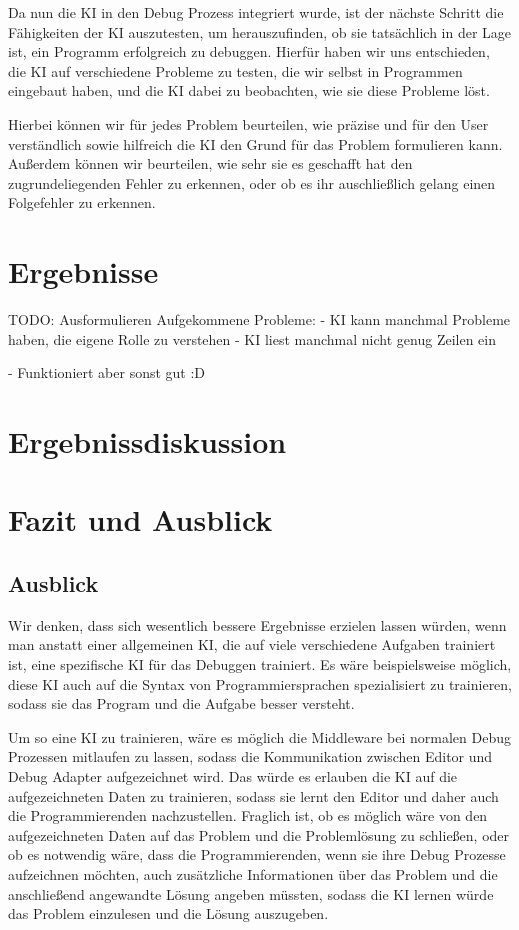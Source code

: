 \documentclass[a4paper,12pt,ngerman]{scrartcl}
\begin{document}
Da nun die KI in den Debug Prozess integriert wurde, ist der nächste Schritt die Fähigkeiten der KI auszutesten, um herauszufinden, ob sie tatsächlich in der Lage ist, ein Programm erfolgreich zu debuggen. Hierfür haben wir uns entschieden, die KI auf verschiedene Probleme zu testen, die wir selbst in Programmen eingebaut haben, und die KI dabei zu beobachten, wie sie diese Probleme löst.

Hierbei können wir für jedes Problem beurteilen, wie präzise und für den User verständlich sowie hilfreich die KI den Grund für das Problem formulieren kann. Außerdem können wir beurteilen, wie sehr sie es geschafft hat den zugrundeliegenden Fehler zu erkennen, oder ob es ihr auschließlich gelang einen Folgefehler zu erkennen.

\section{Ergebnisse}

TODO: Ausformulieren
Aufgekommene Probleme:
- KI kann manchmal Probleme haben, die eigene Rolle zu verstehen
- KI liest manchmal nicht genug Zeilen ein

- Funktioniert aber sonst gut :D

\section{Ergebnissdiskussion}

\section{Fazit und Ausblick}

\subsection{Ausblick}

Wir denken, dass sich wesentlich bessere Ergebnisse erzielen lassen würden, wenn man anstatt einer allgemeinen KI, die auf viele verschiedene Aufgaben trainiert ist, eine spezifische KI für das Debuggen trainiert. Es wäre beispielsweise möglich, diese KI auch auf die Syntax von Programmiersprachen spezialisiert zu trainieren, sodass sie das Program und die Aufgabe besser versteht.

Um so eine KI zu trainieren, wäre es möglich die Middleware bei normalen Debug Prozessen mitlaufen zu lassen, sodass die Kommunikation zwischen Editor und Debug Adapter aufgezeichnet wird. Das würde es erlauben die KI auf die aufgezeichneten Daten zu trainieren, sodass sie lernt den Editor und daher auch die Programmierenden nachzustellen. Fraglich ist, ob es möglich wäre von den aufgezeichneten Daten auf das Problem und die Problemlösung zu schließen, oder ob es notwendig wäre, dass die Programmierenden, wenn sie ihre Debug Prozesse aufzeichnen möchten, auch zusätzliche Informationen über das Problem und die anschließend angewandte Lösung angeben müssten, sodass die KI lernen würde das Problem einzulesen und die Lösung auszugeben.
\end{document}
